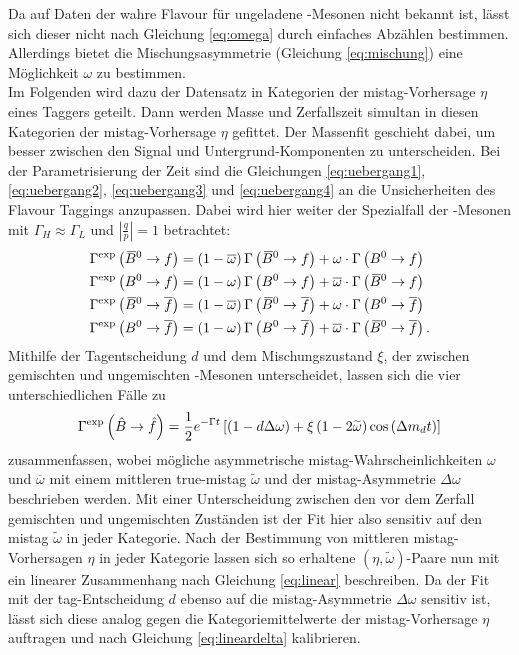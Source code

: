 Da auf Daten der wahre Flavour für ungeladene \B-Mesonen nicht bekannt ist, lässt sich dieser nicht nach Gleichung \eqref{eq:omega} durch einfaches Abzählen bestimmen. Allerdings bietet die Mischungsasymmetrie (Gleichung \eqref{eq:mischung}) eine Möglichkeit $\omega$ zu bestimmen.\\ 
Im Folgenden wird dazu der Datensatz in Kategorien der mistag-Vorhersage $\eta$ eines Taggers geteilt. Dann werden Masse und Zerfallszeit simultan in diesen Kategorien der mistag-Vorhersage $\eta$ gefittet. Der Massenfit geschieht dabei, um besser zwischen den Signal und Untergrund-Komponenten zu unterscheiden. Bei der Parametrisierung der Zeit sind die Gleichungen \eqref{eq:uebergang1}, \eqref{eq:uebergang2}, \eqref{eq:uebergang3} und \eqref{eq:uebergang4} an die Unsicherheiten des Flavour Taggings anzupassen. Dabei wird hier weiter der Spezialfall der \Bz-Mesonen mit $\Gamma_H\approx\Gamma_L$ und $\left|\tfrac{q}{p}\right|=1$ betrachtet:
\begin{equation}
\begin{split}
\Gamma^\text{exp}\left({{\kern 0.18em\overline{\kern -0.18em B}{}}{}^0}\rightarrow f\right)&=\left(1-\overline{\omega}\right)\Gamma\left({{\kern 0.18em\overline{\kern -0.18em B}{}}{}^0}\rightarrow f\right)+\omega\cdot\Gamma\left({{B}^0}\rightarrow f\right)\\
\Gamma^\text{exp}\left({{B}^0}\rightarrow f\right)&=\left(1-\omega\right)\Gamma\left({{B}^0}\rightarrow f\right)+\overline{\omega}\cdot\Gamma\left({{\kern 0.18em\overline{\kern -0.18em B}{}}{}^0}\rightarrow f\right)\\
\Gamma^\text{exp}\left({{\kern 0.18em\overline{\kern -0.18em B}{}}{}^0}\rightarrow\overline{f}\right)&=\left(1-\overline{\omega}\right)\Gamma\left({{\kern 0.18em\overline{\kern -0.18em B}{}}{}^0}\rightarrow\overline{f}\right)+\omega\cdot\Gamma\left({{B}^0}\rightarrow\overline{f}\right)\\
\Gamma^\text{exp}\left({{B}^0}\rightarrow\overline{f}\right)&=\left(1-\omega\right)\Gamma\left({{B}^0}\rightarrow\overline{f}\right)+\overline{\omega}\cdot\Gamma\left({{\kern 0.18em\overline{\kern -0.18em B}{}}{}^0}\rightarrow\overline{f}\right).
\end{split}
\end{equation}
Mithilfe der Tagentscheidung $d$ und dem Mischungszustand $\xi$, der zwischen gemischten und ungemischten \B-Mesonen unterscheidet, lassen sich die vier unterschiedlichen Fälle zu
\begin{equation}
\Gamma^\text{exp}\left(\hat{B}\rightarrow\hat{f}\right)=\frac{1}{2}e^{-\Gamma t}\left[\left(1-d\Delta\omega\right)+\xi\left(1-2\widetilde{\omega}\right)\cos\left({\Delta m_{{d}}} t\right)\right]
\end{equation}
zusammenfassen, wobei mögliche asymmetrische mistag-Wahrscheinlichkeiten $\omega$ und $\overline{\omega}$ mit einem mittleren true-mistag $\widetilde{\omega}$ und der mistag-Asymmetrie $\Delta\omega$ beschrieben werden. Mit einer Unterscheidung zwischen den vor dem Zerfall gemischten und ungemischten Zuständen ist der Fit hier also sensitiv auf den mistag $\widetilde{\omega}$ in jeder Kategorie. Nach der Bestimmung von mittleren mistag-Vorhersagen $\eta$ in jeder Kategorie lassen sich so erhaltene $(\eta,\widetilde{\omega})$-Paare nun mit ein linearer Zusammenhang nach Gleichung \eqref{eq:linear} beschreiben. Da der Fit mit der tag-Entscheidung $d$ ebenso auf die mistag-Asymmetrie $\Delta \omega$ sensitiv ist, lässt sich diese analog gegen die Kategoriemittelwerte der mistag-Vorhersage $\eta$ auftragen und nach Gleichung \eqref{eq:lineardelta} kalibrieren.\\
